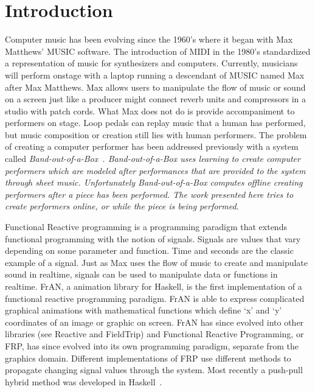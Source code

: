 \documentclass[12pt]{ucthesis}
\begin{document}
\pagestyle{plain}

\renewcommand{\baselinestretch}{1.66}


\chapter{Introduction}
\label{intro}

Computer music has been evolving since the 1960's where it began with Max Matthews' MUSIC software. The introduction of MIDI in the 1980's standardized a representation of music for synthesizers and computers. Currently, musicians will perform onstage with a laptop running a descendant of MUSIC named Max after Max Matthews. Max allows users to manipulate the flow of music or sound on a screen just like a producer might connect reverb units and compressors in a studio with patch cords. What Max does not do is provide accompaniment to performers on stage. Loop pedals can replay music that a human has performed, but music composition or creation still lies with human performers. The problem of creating a computer performer has been addressed previously with a system called \em{Band-out-of-a-Box}\em~\cite{bob}. \em{Band-out-of-a-Box }\em uses learning to create computer performers which are modeled after performances that are provided to the system through sheet music. Unfortunately \em{Band-out-of-a-Box }\em computes offline creating performers after a piece has been performed. The work presented here tries to create performers online, or while the piece is being performed.

Functional Reactive programming is a programming paradigm that extends functional programming with the notion of signals. Signals are values that vary depending on some parameter and function. Time and seconds are the classic example of a signal. Just as Max uses the flow of music to create and manipulate sound in realtime, signals can be used to manipulate data or functions in realtime. FrAN, a animation library for Haskell, is the first implementation of a functional reactive programming paradigm. FrAN is able to express complicated graphical animations with mathematical functions which define `x' and `y' coordinates of an image or graphic on screen. FrAN has since evolved into other libraries (see Reactive and FieldTrip) and Functional Reactive Programming, or FRP, has since evolved into its own programming paradigm, separate from the graphics domain. Different implementations of FRP use different methods to propagate changing signal values through the system. Most recently a push-pull hybrid method was developed in Haskell~\cite{push-pull-frp}. 
\end{document}
